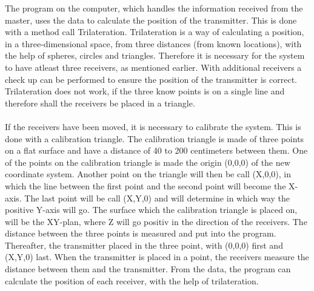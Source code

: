 The program on the computer, which handles the information received from the master, uses the data to calculate the position of the transmitter. This is done with a method call Trilateration. Trilateration is a way of calculating a position, in a three-dimensional space, from three distances (from known locations), with the help of spheres, circles and triangles. Therefore it is necessary for the system to have atleast three receivers, as mentioned earlier.  With additional receivers a check up can be performed to ensure the position of the transmitter is correct. Trilateration does not work, if the three know points is on a single line and therefore shall the receivers be placed in a triangle.\\\\
\noindent
If the receivers have been moved, it is necessary to calibrate the system. This is done with a calibration triangle. The calibration triangle is made of three points on a flat surface and have a distance of 40 to 200 centimeters between them. One of the points on the calibration triangle is made the origin (0,0,0) of the new coordinate system. Another point on the triangle will then be call (X,0,0), in which the line between the first point and the second point will become the X-axis. The last point will be call (X,Y,0) and will determine in which way the positive Y-axis will go. The surface which the calibration triangle is placed on, will be the XY-plan, where Z will go positiv in the direction of the receivers. The distance between the three points is measured and put into the program. Thereafter, the transmitter placed in the three point, with (0,0,0) first and (X,Y,0) last. When the transmitter is placed in a point, the receivers measure the distance between them and the transmitter. From the data, the program can calculate the position of each receiver, with the help of trilateration. \\\\
